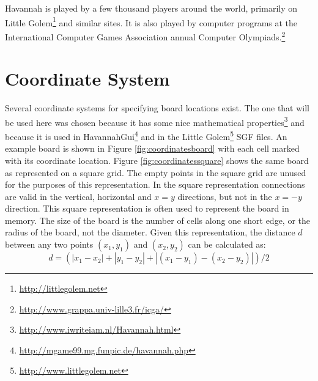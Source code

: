 Havannah is played by a few thousand players around the world, primarily on Little Golem\footnote{\url{http://littlegolem.net}} and similar sites. It is also played by computer programs at the International Computer Games Association annual Computer Olympiads.\footnote{\url{http://www.grappa.univ-lille3.fr/icga/}}



\section{Coordinate System}

Several coordinate systems for specifying board locations exist. The one that will be used here was chosen because it has some nice mathematical properties\footnote{\url{http://www.iwriteiam.nl/Havannah.html}} and because it is used in HavannahGui\footnote{\url{http://mgame99.mg.funpic.de/havannah.php}} and in the Little Golem\footnote{\url{http://www.littlegolem.net}} SGF files. An example board is shown in Figure \ref{fig:coordinatesboard} with each cell marked with its coordinate location. Figure \ref{fig:coordinatessquare} shows the same board as represented on a square grid. The empty points in the square grid are unused for the purposes of this representation. In the square representation connections are valid in the vertical, horizontal and $x=y$ directions, but not in the $x=-y$ direction. This square representation is often used to represent the board in memory. The size of the board is the number of cells along one short edge, or the radius of the board, not the diameter. Given this representation, the distance $d$ between any two points $(x_1,y_1)$ and $(x_2,y_2)$ can be calculated as: $$d = (|x_1-x_2| + |y_1-y_2| + |(x_1-y_1)-(x_2-y_2)|)/2$$


